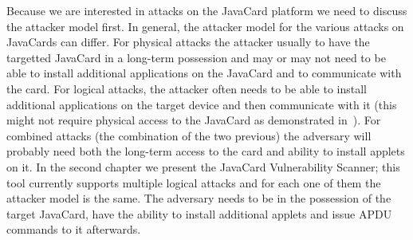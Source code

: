        Because we are interested in attacks on the JavaCard platform we need to discuss the attacker model first. In general, the attacker model for the various attacks on JavaCards can differ. For physical attacks the attacker usually to have the targetted JavaCard in a long-term possession and may or may not need to be able to install additional applications on the JavaCard and to communicate with the card. For logical attacks, the attacker often needs to be able to install additional applications on the target device and then communicate with it (this might not require physical access to the JavaCard as demonstrated in~\cite{se:gemalto:part2}). For combined attacks (the combination of the two previous) the adversary will probably need both the long-term access to the card and ability to install applets on it.
        In the second chapter we present the JavaCard Vulnerability Scanner; this tool currently supports multiple logical attacks and for each one of them the attacker model is the same. The adversary needs to be in the possession of the target JavaCard, have the ability to install additional applets and issue APDU commands to it afterwards.





